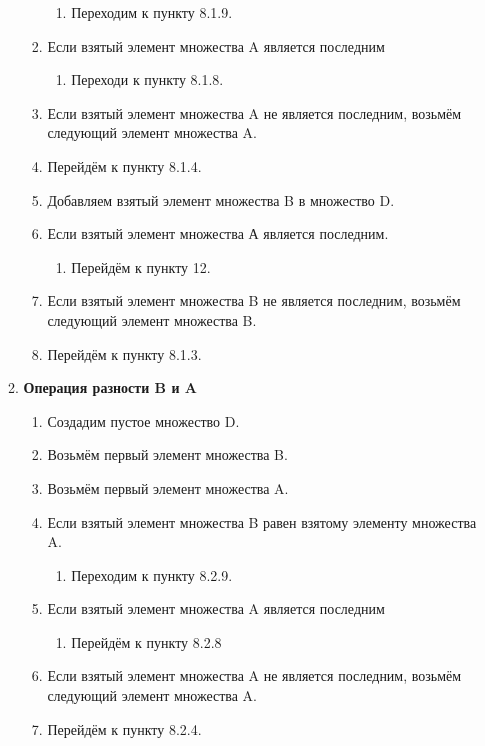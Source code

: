 \documentclass[a4paper,12pt]{extarticle}
\begin{document}
\begin{enumerate}
\begin{enumerate}[label*=\arabic*.]
\begin{enumerate}[label*=\arabic*.]
\begin{enumerate}[label*=\arabic*.]
      \item Переходим к пункту 8.1.9.
    \end{enumerate}
    \item Если взятый элемент множества A является последним
    \begin{enumerate}[label*=\arabic*.]
      \item Переходи к пункту 8.1.8.
    \end{enumerate}
    \item Если взятый элемент множества A не является последним, возьмём следующий элемент множества A.
    \item Перейдём к пункту 8.1.4.
    \item Добавляем взятый элемент множества B в множество D.
    \item Если взятый элемент множества А является последним.
    \begin{enumerate}[label*=\arabic*.]
      \item Перейдём к пункту 12.
    \end{enumerate}
    \item Если взятый элемент множества B не является последним, возьмём следующий элемент множества B.
    \item Перейдём к пункту 8.1.3.
  \end{enumerate}
  \item\textbf{Операция разности B и A}
  \begin{enumerate}[label*=\arabic*.]
    \item Создадим пустое множество D.
    \item Возьмём первый элемент множества B.
    \item Возьмём первый элемент множества A.
    \item Если взятый элемент множества B равен взятому элементу множества A.
    \begin{enumerate}[label*=\arabic*.]
      \item Переходим к пункту 8.2.9.
    \end{enumerate}
    \item Если взятый элемент множества A является последним
    \begin{enumerate}[label*=\arabic*.]
      \item Перейдём к пункту 8.2.8
    \end{enumerate}
    \item Если взятый элемент множества A не является последним, возьмём следующий элемент множества A.
    \item Перейдём к пункту 8.2.4.

\end{enumerate}
\end{enumerate}
\end{enumerate}
\end{document}
